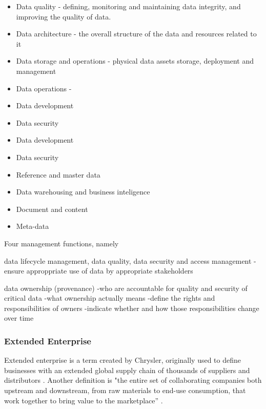 \begin{itemize}
	\item Data quality - defining, monitoring and maintaining data integrity, and improving the quality of data.
	\item Data architecture - the overall structure of the data and resources related to it
	\item Data storage and operations - physical data assets storage, deployment and management
	\item Data operations -
	\item Data development
	\item Data security
	\item Data development
	\item Data security
	\item Reference and master data
	\item Data warehousing and business inteligence
	\item Document and content
	\item Meta-data    
\end{itemize}


Four management functions, namely 

data lifecycle management, 
data quality, 
data security and access management
-ensure approppriate use of data by appropriate stakeholders


data ownership (provenance)
-who are accountable for quality and security of critical data
-what ownership actually means
-define the rights and responsibilities of owners
-indicate whether and how those responsibilities change over time

\subsubsection{Extended Enterprise}
Extended enterprise is a term created by Chrysler, originally used to define businesses with an extended global supply chain of thousands of suppliers and distributors \cite{dyer2000collaborative}. Another definition is "the entire set of collaborating companies both upstream and downstream, from raw materials to end-use consumption, that work together to bring value to the marketplace” \cite{spekman2004risky}. 

